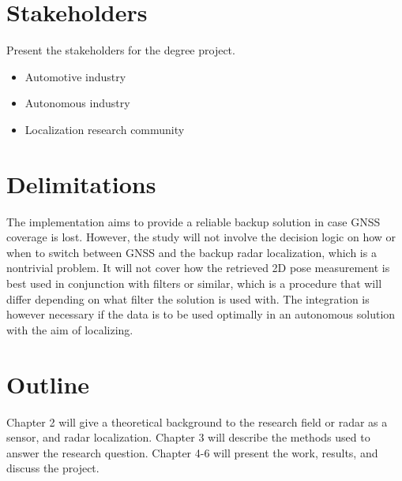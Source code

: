 



\section{Stakeholders}
Present the stakeholders for the degree project.
\begin{itemize}
    \item Automotive industry 
    \item Autonomous industry 
    \item Localization research community
\end{itemize}
\section{Delimitations}
The implementation aims to provide a reliable backup solution in case GNSS coverage is lost. However, the study will not involve the decision logic on how or when to switch between GNSS and the backup radar localization, which is a nontrivial problem. It will not cover how the retrieved 2D pose measurement is best used in conjunction with filters or similar, which is a procedure that will differ depending on what filter the solution is used with. The integration is however necessary if the data is to be used optimally in an autonomous solution with the aim of localizing. 

\section{Outline}
Chapter 2 will give a theoretical background to the research field or radar as a sensor, and radar localization. Chapter 3 will describe the methods used to answer the research question. Chapter 4-6 will present the work, results, and discuss the project.